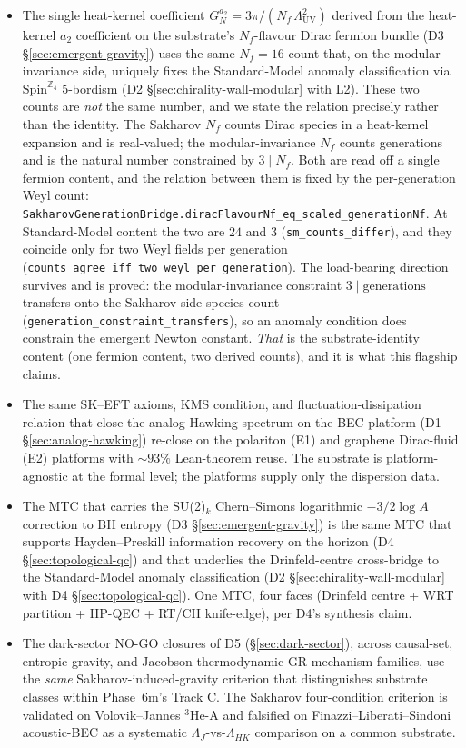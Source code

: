 \documentclass[aps,prd,reprint,nofootinbib,superscriptaddress]{revtex4-2}
\begin{document}
\begin{itemize}
\item The single heat-kernel coefficient
  $G_N^{a_2} = 3\pi/(N_f\,\Lambda_{\mathrm{UV}}^{2})$
  derived from the heat-kernel $a_2$ coefficient on the substrate's
  $N_f$-flavour Dirac fermion bundle (D3 \S\ref{sec:emergent-gravity})
  uses the same $N_f = 16$ count that, on the modular-invariance side,
  uniquely fixes the Standard-Model anomaly classification via
  $\mathrm{Spin}^{\mathbb{Z}_4}$ 5-bordism (D2
  \S\ref{sec:chirality-wall-modular} with L2). These two counts are
  \emph{not} the same number, and we state the relation precisely rather
  than the identity. The Sakharov $N_f$ counts Dirac species in a
  heat-kernel expansion and is real-valued; the modular-invariance $N_f$
  counts generations and is the natural number constrained by
  $3 \mid N_f$. Both are read off a single fermion content, and the
  relation between them is fixed by the per-generation Weyl count:
  \texttt{SakharovGenerationBridge.diracFlavourNf\_eq\_scaled\_generationNf}.
  At Standard-Model content the two are $24$ and $3$
  (\texttt{sm\_counts\_differ}), and they coincide only for two Weyl
  fields per generation
  (\texttt{counts\_agree\_iff\_two\_weyl\_per\_generation}). The
  load-bearing direction survives and is proved: the modular-invariance
  constraint $3 \mid \text{generations}$ transfers onto the Sakharov-side
  species count
  (\texttt{generation\_constraint\_transfers}), so an anomaly condition
  does constrain the emergent Newton constant. \emph{That} is the
  substrate-identity content (one fermion content, two derived counts),
  and it is what this flagship claims.
\item The same SK--EFT axioms, KMS condition, and
  fluctuation-dissipation relation that close the analog-Hawking
  spectrum on the BEC platform (D1 \S\ref{sec:analog-hawking})
  re-close on the polariton (E1) and graphene Dirac-fluid (E2)
  platforms with $\sim 93\%$ Lean-theorem reuse. The substrate is
  platform-agnostic at the formal level; the platforms supply only
  the dispersion data.
\item The MTC that carries the SU(2)$_k$ Chern--Simons logarithmic
  $-3/2\log A$ correction to BH entropy (D3
  \S\ref{sec:emergent-gravity}) is the same MTC that supports
  Hayden--Preskill information recovery on the horizon (D4
  \S\ref{sec:topological-qc}) and that underlies the Drinfeld-centre
  cross-bridge to the Standard-Model anomaly classification (D2
  \S\ref{sec:chirality-wall-modular} with D4
  \S\ref{sec:topological-qc}). One MTC, four faces (Drinfeld centre +
  WRT partition + HP-QEC + RT/CH knife-edge), per D4's synthesis
  claim.
\item The dark-sector NO-GO closures of D5
  (\S\ref{sec:dark-sector}), across causal-set, entropic-gravity, and
  Jacobson thermodynamic-GR mechanism families, use the \emph{same}
  Sakharov-induced-gravity criterion that distinguishes substrate
  classes within Phase~6m's Track C. The Sakharov four-condition
  criterion is validated on Volovik--Jannes ${}^3\mathrm{He}$-A and
  falsified on Finazzi--Liberati--Sindoni acoustic-BEC as a
  systematic $\Lambda_J$-vs-$\Lambda_{HK}$ comparison on a common
  substrate.
\end{itemize}
\end{document}
